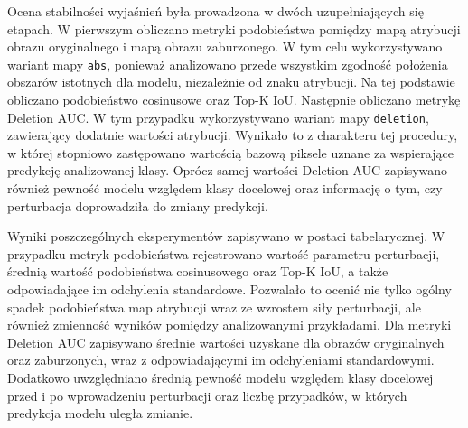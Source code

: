 Ocena stabilności wyjaśnień była prowadzona w dwóch uzupełniających się etapach. W pierwszym obliczano metryki podobieństwa pomiędzy mapą atrybucji obrazu oryginalnego i mapą obrazu zaburzonego. W tym celu wykorzystywano wariant mapy \texttt{abs}, ponieważ analizowano przede wszystkim zgodność położenia obszarów istotnych dla modelu, niezależnie od znaku atrybucji. Na tej podstawie obliczano podobieństwo cosinusowe oraz Top-K IoU. Następnie obliczano metrykę Deletion AUC. W tym przypadku wykorzystywano wariant mapy \texttt{deletion}, zawierający dodatnie wartości atrybucji. Wynikało to z charakteru tej procedury, w której stopniowo zastępowano wartością bazową piksele uznane za wspierające predykcję analizowanej klasy. Oprócz samej wartości Deletion AUC zapisywano również pewność modelu względem klasy docelowej oraz informację o tym, czy perturbacja doprowadziła do zmiany predykcji.

Wyniki poszczególnych eksperymentów zapisywano w postaci tabelarycznej. W przypadku metryk podobieństwa rejestrowano wartość parametru perturbacji, średnią wartość podobieństwa cosinusowego oraz Top-K IoU, a także odpowiadające im odchylenia standardowe. Pozwalało to ocenić nie tylko ogólny spadek podobieństwa map atrybucji wraz ze wzrostem siły perturbacji, ale również zmienność wyników pomiędzy analizowanymi przykładami. Dla metryki Deletion AUC zapisywano średnie wartości uzyskane dla obrazów oryginalnych oraz zaburzonych, wraz z odpowiadającymi im odchyleniami standardowymi. Dodatkowo uwzględniano średnią pewność modelu względem klasy docelowej przed i po wprowadzeniu perturbacji oraz liczbę przypadków, w których predykcja modelu uległa zmianie.